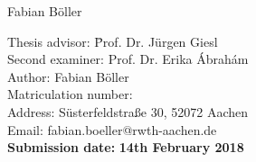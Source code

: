 \begin{center}
  {\LARGE Fabian Böller}\\[35mm]
  
  \parbox{120mm}{
    \begin{large}
      \begin{tabbing}
        Thesis advisor: \hspace{1.5cm} \= Prof. Dr. Jürgen Giesl\\
        Second examiner: \> Prof. Dr. Erika Ábrahám\\[1cm]
        Author:\> Fabian Böller\\ %
        Matriculation number:\\
        Address:\> Süsterfeldstraße 30, 52072 Aachen\\
        Email:\> fabian.boeller@rwth-aachen.de\\
        \textbf{Submission date:} \> \textbf{14th February 2018}\\
      \end{tabbing}
    \end{large}
  }
  
\end{center}
